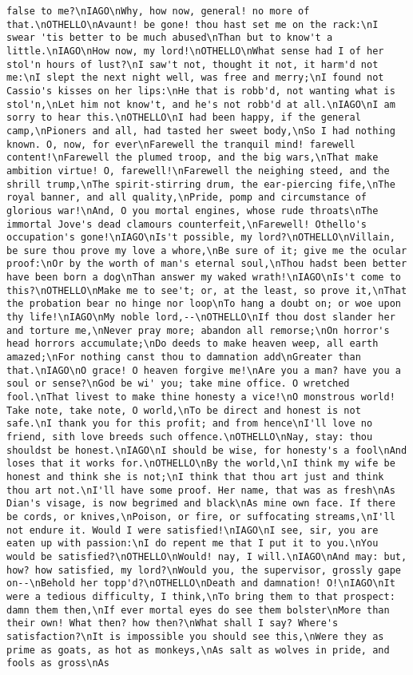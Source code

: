 \begin{verbatim}
false to me?\nIAGO\nWhy, how now, general! no more of that.\nOTHELLO\nAvaunt! be gone! thou hast set me on the rack:\nI swear 'tis better to be much abused\nThan but to know't a little.\nIAGO\nHow now, my lord!\nOTHELLO\nWhat sense had I of her stol'n hours of lust?\nI saw't not, thought it not, it harm'd not me:\nI slept the next night well, was free and merry;\nI found not Cassio's kisses on her lips:\nHe that is robb'd, not wanting what is stol'n,\nLet him not know't, and he's not robb'd at all.\nIAGO\nI am sorry to hear this.\nOTHELLO\nI had been happy, if the general camp,\nPioners and all, had tasted her sweet body,\nSo I had nothing known. O, now, for ever\nFarewell the tranquil mind! farewell content!\nFarewell the plumed troop, and the big wars,\nThat make ambition virtue! O, farewell!\nFarewell the neighing steed, and the shrill trump,\nThe spirit-stirring drum, the ear-piercing fife,\nThe royal banner, and all quality,\nPride, pomp and circumstance of glorious war!\nAnd, O you mortal engines, whose rude throats\nThe immortal Jove's dead clamours counterfeit,\nFarewell! Othello's occupation's gone!\nIAGO\nIs't possible, my lord?\nOTHELLO\nVillain, be sure thou prove my love a whore,\nBe sure of it; give me the ocular proof:\nOr by the worth of man's eternal soul,\nThou hadst been better have been born a dog\nThan answer my waked wrath!\nIAGO\nIs't come to this?\nOTHELLO\nMake me to see't; or, at the least, so prove it,\nThat the probation bear no hinge nor loop\nTo hang a doubt on; or woe upon thy life!\nIAGO\nMy noble lord,--\nOTHELLO\nIf thou dost slander her and torture me,\nNever pray more; abandon all remorse;\nOn horror's head horrors accumulate;\nDo deeds to make heaven weep, all earth amazed;\nFor nothing canst thou to damnation add\nGreater than that.\nIAGO\nO grace! O heaven forgive me!\nAre you a man? have you a soul or sense?\nGod be wi' you; take mine office. O wretched fool.\nThat livest to make thine honesty a vice!\nO monstrous world! Take note, take note, O world,\nTo be direct and honest is not safe.\nI thank you for this profit; and from hence\nI'll love no friend, sith love breeds such offence.\nOTHELLO\nNay, stay: thou shouldst be honest.\nIAGO\nI should be wise, for honesty's a fool\nAnd loses that it works for.\nOTHELLO\nBy the world,\nI think my wife be honest and think she is not;\nI think that thou art just and think thou art not.\nI'll have some proof. Her name, that was as fresh\nAs Dian's visage, is now begrimed and black\nAs mine own face. If there be cords, or knives,\nPoison, or fire, or suffocating streams,\nI'll not endure it. Would I were satisfied!\nIAGO\nI see, sir, you are eaten up with passion:\nI do repent me that I put it to you.\nYou would be satisfied?\nOTHELLO\nWould! nay, I will.\nIAGO\nAnd may: but, how? how satisfied, my lord?\nWould you, the supervisor, grossly gape on--\nBehold her topp'd?\nOTHELLO\nDeath and damnation! O!\nIAGO\nIt were a tedious difficulty, I think,\nTo bring them to that prospect: damn them then,\nIf ever mortal eyes do see them bolster\nMore than their own! What then? how then?\nWhat shall I say? Where's satisfaction?\nIt is impossible you should see this,\nWere they as prime as goats, as hot as monkeys,\nAs salt as wolves in pride, and fools as gross\nAs 
\end{verbatim}
